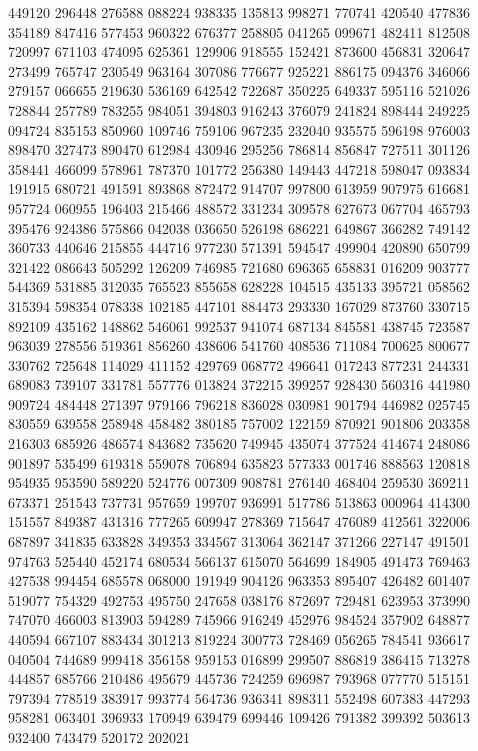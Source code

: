 {449120 296448 276588 088224 938335 135813 998271 770741 420540 477836 354189%
847416 577453 960322 676377 258805 041265 099671 482411 812508 720997 671103%
474095 625361 129906 918555 152421 873600 456831 320647 273499 765747 230549%
963164 307086 776677 925221 886175 094376 346066 279157 066655 219630 536169%
642542 722687 350225 649337 595116 521026 728844 257789 783255 984051 394803%
916243 376079 241824 898444 249225 094724 835153 850960 109746 759106 967235%
232040 935575 596198 976003 898470 327473 890470 612984 430946 295256 786814%
856847 727511 301126 358441 466099 578961 787370 101772 256380 149443 447218%
598047 093834 191915 680721 491591 893868 872472 914707 997800 613959 907975%
616681 957724 060955 196403 215466 488572 331234 309578 627673 067704 465793%
395476 924386 575866 042038 036650 526198 686221 649867 366282 749142 360733%
440646 215855 444716 977230 571391 594547 499904 420890 650799 321422 086643%
505292 126209 746985 721680 696365 658831 016209 903777 544369 531885 312035%
765523 855658 628228 104515 435133 395721 058562 315394 598354 078338 102185%
447101 884473 293330 167029 873760 330715 892109 435162 148862 546061 992537%
941074 687134 845581 438745 723587 963039 278556 519361 856260 438606 541760%
408536 711084 700625 800677 330762 725648 114029 411152 429769 068772 496641%
017243 877231 244331 689083 739107 331781 557776 013824 372215 399257 928430%
560316 441980 909724 484448 271397 979166 796218 836028 030981 901794 446982%
025745 830559 639558 258948 458482 380185 757002 122159 870921 901806 203358%
216303 685926 486574 843682 735620 749945 435074 377524 414674 248086 901897%
535499 619318 559078 706894 635823 577333 001746 888563 120818 954935 953590%
589220 524776 007309 908781 276140 468404 259530 369211 673371 251543 737731%
957659 199707 936991 517786 513863 000964 414300 151557 849387 431316 777265%
609947 278369 715647 476089 412561 322006 687897 341835 633828 349353 334567%
313064 362147 371266 227147 491501 974763 525440 452174 680534 566137 615070%
564699 184905 491473 769463 427538 994454 685578 068000 191949 904126 963353%
895407 426482 601407 519077 754329 492753 495750 247658 038176 872697 729481%
623953 373990 747070 466003 813903 594289 745966 916249 452976 984524 357902%
648877 440594 667107 883434 301213 819224 300773 728469 056265 784541 936617%
040504 744689 999418 356158 959153 016899 299507 886819 386415 713278 444857%
685766 210486 495679 445736 724259 696987 793968 077770 515151 797394 778519%
383917 993774 564736 936341 898311 552498 607383 447293 958281 063401 396933%
170949 639479 699446 109426 791382 399392 503613 932400 743479 520172 202021%
}

